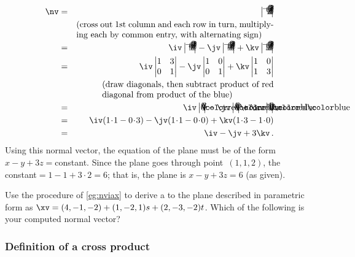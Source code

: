 \begin{example}
\begin{solution}
\begin{eqnarray*}
\nv&=& \abc0 
\\&&\parbox{23em}{(cross out 1st column and each row in turn, multiplying each by common entry, with alternating sign)}
\\&=&\iv\abc1-\jv\abc2+\kv\abc3
\\&=&\iv\begin{vmatrix} 1&3\\0&1 \end{vmatrix}
-\jv\begin{vmatrix} 1&0\\0&1 \end{vmatrix}
+\kv\begin{vmatrix} 1&0\\1&3 \end{vmatrix}
\\&&\parbox{20em}{(draw diagonals, then subtract product of red diagonal from product of the blue)}
\\&=&\iv\ab1301
-\jv\ab1001
+\kv\ab1013
\\&=&\iv(1\cdot1-0\cdot3)
-\jv(1\cdot1-0\cdot0)
+\kv(1\cdot3-1\cdot0)
\\&=&\iv-\jv+3\kv\,.
\end{eqnarray*}
Using this normal vector, the equation of the plane must be of the form \(x-y+3z={}\)constant.
Since the plane goes through point~\((1,1,2)\), the constant\({}=1-1+3\cdot2=6\); that is, the plane is \(x-y+3z=6\) (as given).
\end{solution}
\end{example}




\begin{activity}  
Use the procedure of \cref{eg:nviax} to derive a  to the plane described in parametric form as \(\xv=(4,-1,-2)+(1,-2,1)s+(2,-3,-2)t\).  
Which of the following is your computed normal vector?
\end{activity}




\subsubsection{Definition of a cross product}

